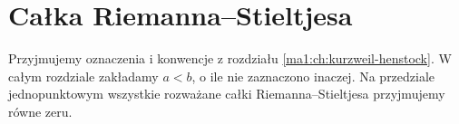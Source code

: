 \chapter{Całka Riemanna--Stieltjesa}
\providecommand{\atlasref}[2]{#2}
\label{ma1:ch:calka-riemanna-stieltjesa}
\begingroup
\providecommand{\osc}{\operatorname{osc}}
\providecommand{\Var}{\operatorname{Var}}
\providecommand{\mesh}{\operatorname{mesh}}
\providecommand{\supp}{\operatorname{supp}}
\providecommand{\AC}{\mathrm{AC}}
\providecommand{\BV}{\mathrm{BV}}
\providecommand{\HK}{\mathrm{KH}}
\providecommand{\ind}[1]{\chi_{#1}}
\providecommand{\Dn}{\underline D}
\providecommand{\Du}{\overline D}
\providecommand{\KS}{\mathrm{KS}}
Przyjmujemy oznaczenia i konwencje z rozdziału \ref{ma1:ch:kurzweil-henstock}.
W całym rozdziale zakładamy $a<b$, o ile nie zaznaczono
inaczej. Na przedziale jednopunktowym wszystkie rozważane
całki Riemanna--Stieltjesa przyjmujemy równe zeru.
